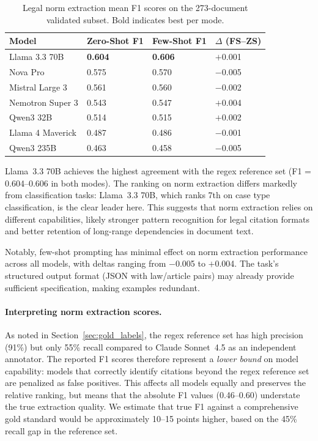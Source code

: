 \documentclass[11pt,a4paper]{article}
\begin{document}
\begin{table}[t]
\centering
\caption{Legal norm extraction mean F1 scores on the 273-document validated subset. Bold indicates best per mode.}
\label{tab:norm_extraction}
\begin{tabular}{lR{2.0cm}R{2.0cm}R{2.0cm}}
\toprule
\textbf{Model} & \textbf{Zero-Shot F1} & \textbf{Few-Shot F1} & \textbf{$\Delta$ (FS--ZS)} \\
\midrule
Llama 3.3 70B     & \textbf{0.604} & \textbf{0.606} & $+$0.001 \\
Nova Pro          & 0.575          & 0.570          & $-$0.005 \\
Mistral Large 3   & 0.561          & 0.560          & $-$0.002 \\
Nemotron Super 3  & 0.543          & 0.547          & $+$0.004 \\
Qwen3 32B         & 0.514          & 0.515          & $+$0.002 \\
Llama 4 Maverick  & 0.487          & 0.486          & $-$0.001 \\
Qwen3 235B        & 0.463          & 0.458          & $-$0.005 \\
\bottomrule
\end{tabular}
\end{table}


Llama~3.3 70B achieves the highest agreement with the regex reference set (F1 = 0.604--0.606 in both modes). The ranking on norm extraction differs markedly from classification tasks: Llama~3.3 70B, which ranks 7th on case type classification, is the clear leader here. This suggests that norm extraction relies on different capabilities, likely stronger pattern recognition for legal citation formats and better retention of long-range dependencies in document text.

Notably, few-shot prompting has minimal effect on norm extraction performance across all models, with deltas ranging from $-$0.005 to $+$0.004. The task's structured output format (JSON with law/article pairs) may already provide sufficient specification, making examples redundant.

\paragraph{Interpreting norm extraction scores.} As noted in Section~\ref{sec:gold_labels}, the regex reference set has high precision (91\%) but only 55\% recall compared to Claude Sonnet~4.5 as an independent annotator. The reported F1 scores therefore represent a \emph{lower bound} on model capability: models that correctly identify citations beyond the regex reference set are penalized as false positives. This affects all models equally and preserves the relative ranking, but means that the absolute F1 values (0.46--0.60) understate the true extraction quality. We estimate that true F1 against a comprehensive gold standard would be approximately 10--15 points higher, based on the 45\% recall gap in the reference set.
\end{document}
